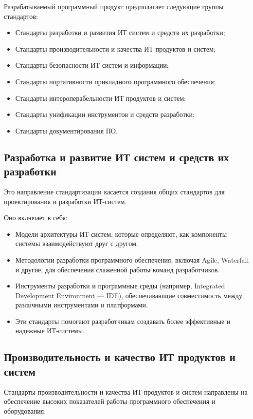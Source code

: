 Разрабатываемый программный продукт предполагает следующие группы стандартов:

\begin{itemize}
	\item Стандарты разработки и развития ИТ систем и средств их разработки;
\item Стандарты производительности и качества ИТ продуктов и систем;
\item Стандарты безопасности ИТ систем и информации;
	\item Стандарты портативности прикладного программного обеспечения;
		\item Стандарты интероперабельности ИТ продуктов и систем;
		\item Стандарты унификации инструментов и средств разработки;
	\item Стандарты документирования ПО.
\end{itemize}

\subsection{Разработка и развитие ИТ систем и средств их разработки}

Это направление стандартизации касается создания общих стандартов
для проектирования и разработки ИТ-систем.

Оно включает в себя:

\begin{itemize}
	\item Модели архитектуры ИТ-систем, которые определяют,
		как компоненты системы взаимодействуют друг с другом.
	\item Методологии разработки программного обеспечения,
		включая Agile, Waterfall и другие,
		для обеспечения слаженной работы команд разработчиков.
	\item Инструменты разработки и программные среды
		(например, Integrated Development Environment — IDE),
		обеспечивающие совместимость между различными инструментами
		и платформами.
	\item Эти стандарты помогают разработчикам создавать более эффективные
		и надежные ИТ-системы.
\end{itemize}

\subsection{Производительность и качество ИТ продуктов и систем}

Стандарты производительности и качества ИТ-продуктов и систем
направлены на обеспечение высоких показателей работы программного обеспечения
и оборудования.


